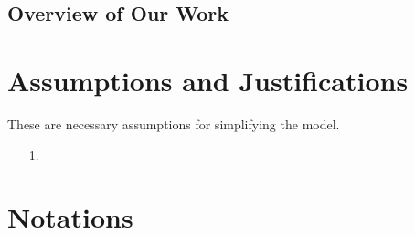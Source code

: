 \documentclass{mcmthesis}
\numberwithin{figure}{section}
\numberwithin{table}{section}
\numberwithin{equation}{section}
\begin{document}
\subsection{Overview of Our Work}

\newpage



\section{Assumptions and Justifications}
These are necessary assumptions for simplifying the model.
\begin{enumerate}
  \item [1.] 
\end{enumerate}


\section{Notations}

\renewcommand\arraystretch{1.5}

\end{document}
